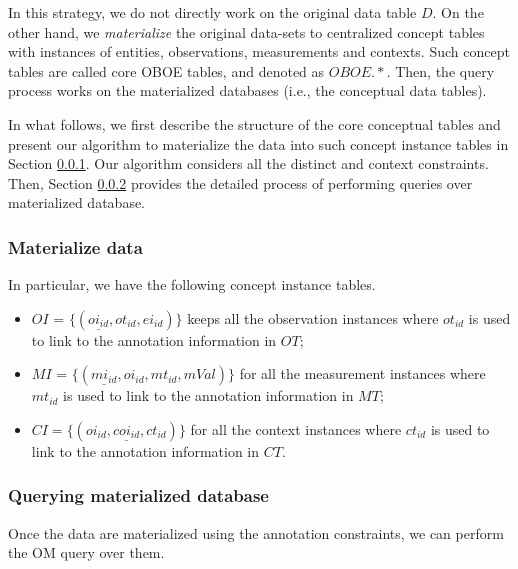 In this strategy, we do not directly work on the original data table
$D$. On the other hand, we {\em materialize} the original data-sets to
centralized concept tables with instances of entities, observations, measurements
and contexts. Such concept tables are called core OBOE tables, and denoted as
$OBOE.*$. 
Then, the query process works on the materialized databases (i.e., the
conceptual data tables). 

In what follows, we first describe the structure of the core
conceptual tables and present our algorithm to materialize the data into such
concept instance tables in Section \ref{sec:materialilzedb}. Our
algorithm considers all the distinct and context constraints. 
Then, Section \ref{sec:query_materialilzedb} provides the detailed
process of performing queries over materialized database. 

\subsubsection{Materialize data}\label{sec:materialilzedb}

In particular, we have the following concept instance tables. 
\begin{itemize}
\item $OI$ = $\{(\underline{oi_{id}}, ot_{id}, ei_{id})\}$ keeps
  all the observation instances where $ot_{id}$ is used to link to the
  annotation information in $OT$; 
\item $MI$ = $\{(\underline{mi_{id}}, oi_{id}, mt_{id},
  mVal)\}$ for all the measurement instances where $mt_{id}$ is used to link to the
  annotation information in $MT$; 
\item $CI =\{(\underline{oi_{id},coi_{id},ct_{id}})\}$ for
  all the context instances where $ct_{id}$ is used to link to the
  annotation information in $CT$. 
\end{itemize}


\subsubsection{Querying materialized database}\label{sec:query_materialilzedb}

Once the data are materialized using the annotation constraints, we
can perform the OM query over them. 

